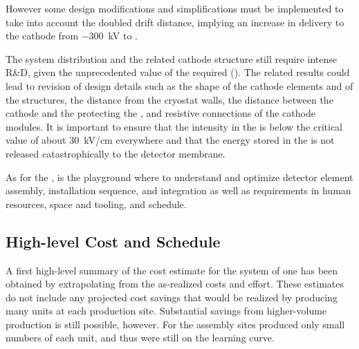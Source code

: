 However some design modifications and simplifications must be implemented to take into account the %
doubled drift distance, implying an increase in  delivery to the cathode from \SI{-300}{\kV} to \dptargetdriftvoltneg{}.

The \dual {} system distribution and the related cathode structure still require intense R\&D, given the unprecedented value of the required  (\dptargetdriftvoltneg).
The related results could lead to revision of design details such as the shape of the cathode elements and of the %
 structures, the distance from the cryostat walls, the distance between the cathode and the %
 protecting the , and resistive connections of the cathode modules. It is important to ensure that the \efield intensity in the \lar is below the critical value of  about \SI{30}{\kV/\cm} everywhere and that the energy stored in the  is not  released catastrophically to the detector membrane. %

As for the ,  is the playground where to understand and optimize detector element assembly, installation sequence, and integration as well as requirements in %
human resources, space and tooling, and schedule. 



%
%
%
\subsection{High-level Cost and Schedule}
\label{sec:fddp-hv-org-cs}

A first high-level summary of the cost estimate for the  system of one  has been obtained by extrapolating from the as-realized  costs and effort. These estimates do not include any projected cost savings that would be realized by producing many units at each production site. %
Substantial savings from higher-volume production is still possible, however. For  the assembly sites produced only small numbers of each unit, and thus were still on the learning curve. 

